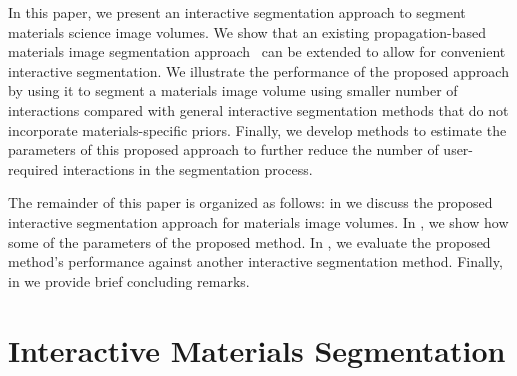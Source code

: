 \documentclass[]{spie}  %
\begin{document}
In this paper, we present an interactive segmentation approach to
segment materials science image volumes.  We show that an existing
propagation-based materials image segmentation
approach~\cite{waggoner:11} can be extended to allow for convenient
interactive segmentation.  We illustrate the performance of the
proposed approach by using it to segment a materials image volume
using smaller number of interactions compared with general interactive
segmentation methods that do not incorporate materials-specific
priors.  Finally, we develop methods to estimate the parameters of
this proposed approach to further reduce the number of user-required
interactions in the segmentation process.

The remainder of this paper is organized as follows: in
 we discuss the proposed interactive segmentation
approach for materials image volumes. In , we show how
some of the parameters of the proposed method.  In , we
evaluate the proposed method's performance against another interactive
segmentation method.  Finally, in  we provide brief
concluding remarks.

\section{Interactive Materials Segmentation}
\label{sec:interactive}
\end{document}
